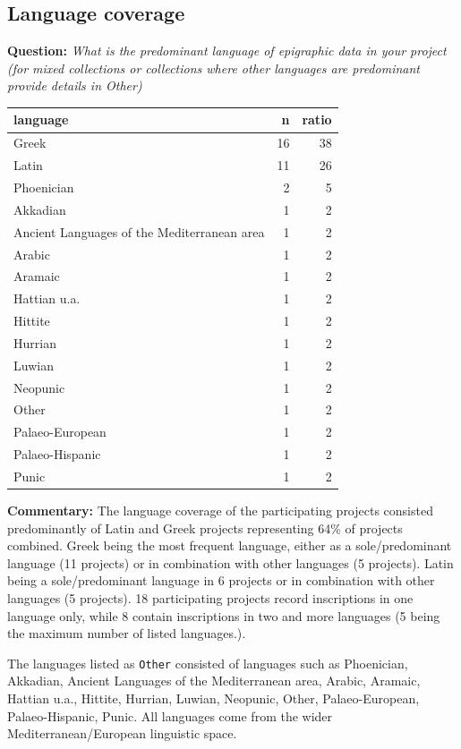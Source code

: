 \documentclass[
  10pt,
]{article}
\begin{document}
\hypertarget{language-coverage-1}{%
\subsection{Language coverage}\label{language-coverage-1}}

\textbf{Question:} \emph{What is the predominant language of epigraphic
data in your project (for mixed collections or collections where other
languages are predominant provide details in Other)}

\begin{longtable}[]{@{}lrr@{}}
\toprule
language & n & ratio \\
\midrule
\endhead
Greek & 16 & 38 \\
Latin & 11 & 26 \\
Phoenician & 2 & 5 \\
Akkadian & 1 & 2 \\
Ancient Languages of the Mediterranean area & 1 & 2 \\
Arabic & 1 & 2 \\
Aramaic & 1 & 2 \\
Hattian u.a. & 1 & 2 \\
Hittite & 1 & 2 \\
Hurrian & 1 & 2 \\
Luwian & 1 & 2 \\
Neopunic & 1 & 2 \\
Other & 1 & 2 \\
Palaeo-European & 1 & 2 \\
Palaeo-Hispanic & 1 & 2 \\
Punic & 1 & 2 \\
\bottomrule
\end{longtable}

\textbf{Commentary:} The language coverage of the participating projects
consisted predominantly of Latin and Greek projects representing 64\% of
projects combined. Greek being the most frequent language, either as a
sole/predominant language (11 projects) or in combination with other
languages (5 projects). Latin being a sole/predominant language in 6
projects or in combination with other languages (5 projects). 18
participating projects record inscriptions in one language only, while 8
contain inscriptions in two and more languages (5 being the maximum
number of listed languages.).

The languages listed as \texttt{Other} consisted of languages such as
Phoenician, Akkadian, Ancient Languages of the Mediterranean area,
Arabic, Aramaic, Hattian u.a., Hittite, Hurrian, Luwian, Neopunic,
Other, Palaeo-European, Palaeo-Hispanic, Punic. All languages come from
the wider Mediterranean/European linguistic space.
\end{document}
